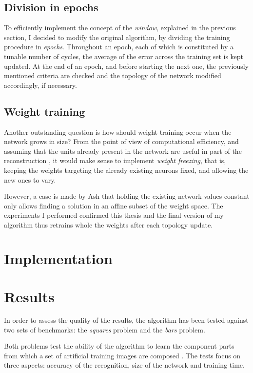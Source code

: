 \documentclass[11pt,a4paper]{report}
\begin{document}
			\subsection{Division in epochs}
				To efficiently implement the concept of the \emph{window}, explained in the previous section, I decided to modify the original algorithm, by dividing the training procedure in \emph{epochs}. Throughout an epoch, each of which is constituted by a tunable number of cycles, the average of the error across the training set is kept updated. At the end of an epoch, and before starting the next one, the previously mentioned criteria are checked and the topology of the network modified accordingly, if necessary.
			
			\subsection{Weight training}
				Another outstanding question is how should weight training occur when the network grows in size? From the point of view of computational efficiency, and assuming that the units already present in the network are useful in part of the reconstruction \cite{kwok1997objective}, it would make sense to implement \emph{weight freezing}, that is, keeping the weights targeting the already existing neurons fixed, and allowing the new ones to vary.
				
				However, a case is made by Ash \cite{ash1989dynamic} that holding the existing network values constant only allows finding a solution in an affine subset of the weight space. The experiments I performed confirmed this thesis and the final version of my algorithm thus retrains whole the weights after each topology update.
			
		\section{Implementation}
			
		\section{Results}
			In order to assess the quality of the results, the algorithm has been tested against two sets of benchmarks: the \emph{squares} problem and the \emph{bars} problem.
			
			Both problems test the ability of the algorithm to learn the component parts from which a set of artificial training images are composed \cite{spratling2009unsupervised,spratling2012unsupervised}. The tests focus on three aspects: accuracy of the recognition, size of the network and training time.
			
\end{document}
